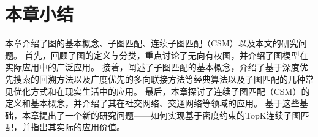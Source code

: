 \section{本章小结}
本章介绍了图的基本概念、子图匹配、连续子图匹配（CSM）以及本文的研究问题。
首先，回顾了图的定义与分类，重点讨论了无向有权图，并介绍了图模型在实际应用中的广泛应用。
接着，阐述了子图匹配的基本概念，介绍了基于深度优先搜索的回溯方法以及广度优先的多向联接方法等经典算法以及子图匹配的几种常见优化方式和在现实生活中的应用。
最后，本章探讨了连续子图匹配（CSM）的定义和基本概念，并介绍了其在社交网络、交通网络等领域的应用。
基于这些基础，本章提出了一个新的研究问题——如何实现基于密度约束的TopK连续子图匹配，并指出其实际的应用价值。